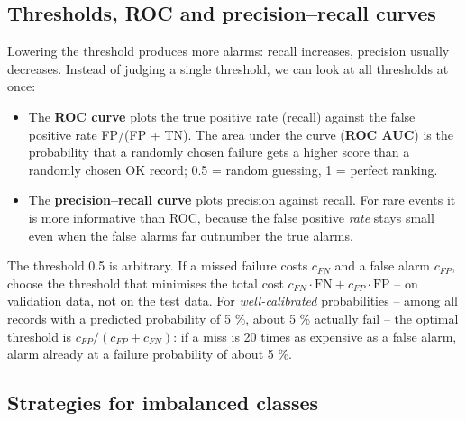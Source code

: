 \documentclass[
  letterpaper,
  DIV=11,
  numbers=noendperiod]{scrreprt}
\providecommand{\tightlist}{%
  \setlength{\itemsep}{0pt}\setlength{\parskip}{0pt}}\usepackage{longtable,booktabs,array}
\begin{document}
\subsection{Thresholds, ROC and precision--recall
curves}\label{thresholds-roc-and-precisionrecall-curves}

Lowering the threshold produces more alarms: recall increases, precision
usually decreases. Instead of judging a single threshold, we can look at
all thresholds at once:

\begin{itemize}
\tightlist
\item
  The \textbf{ROC curve} plots the true positive rate (recall) against
  the false positive rate FP/(FP + TN). The area under the curve
  (\textbf{ROC AUC}) is the probability that a randomly chosen failure
  gets a higher score than a randomly chosen OK record; 0.5 = random
  guessing, 1 = perfect ranking.
\item
  The \textbf{precision--recall curve} plots precision against recall.
  For rare events it is more informative than ROC, because the false
  positive \emph{rate} stays small even when the false alarms far
  outnumber the true alarms.
\end{itemize}

\begin{tcolorbox}[enhanced jigsaw, left=2mm, title=\textcolor{quarto-callout-tip-color}{\faLightbulb}\hspace{0.5em}{Engineering practice: choose the threshold by costs}, opacityback=0, breakable, rightrule=.15mm, arc=.35mm, toptitle=1mm, colbacktitle=quarto-callout-tip-color!10!white, opacitybacktitle=0.6, coltitle=black, colframe=quarto-callout-tip-color-frame, bottomrule=.15mm, leftrule=.75mm, bottomtitle=1mm, titlerule=0mm, toprule=.15mm, colback=white]

The threshold 0.5 is arbitrary. If a missed failure costs \(c_{FN}\) and
a false alarm \(c_{FP}\), choose the threshold that minimises the total
cost \(c_{FN} \cdot \text{FN} + c_{FP} \cdot \text{FP}\) -- on
validation data, not on the test data. For \emph{well-calibrated}
probabilities -- among all records with a predicted probability of 5 \%,
about 5 \% actually fail -- the optimal threshold is
\(c_{FP}/(c_{FP} + c_{FN})\): if a miss is 20 times as expensive as a
false alarm, alarm already at a failure probability of about 5 \%.

\end{tcolorbox}

\subsection{Strategies for imbalanced
classes}\label{strategies-for-imbalanced-classes}
\end{document}

